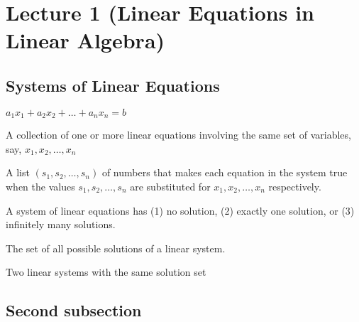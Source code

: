 
\section[Lecture 1 (16 August 2023) -- {\it Linear Equations in Linear Algebra}]{Lecture 1 (Linear Equations in Linear Algebra)}

\subsection{Systems of Linear Equations}

\begin{definition}
    $a_1 x_1 + a_2 x_2 + \ldots + a_n x_n = b$

\end{definition}

\begin{definition}
    A collection of one or more linear equations involving the same set of variables, say, $x_1, x_2, \ldots, x_n$
    
\end{definition}

\begin{definition}
    A list $\left( s_1, s_2, \ldots, s_n  \right)$ of numbers that makes each equation in the system true when the values $s_1, s_2, \ldots, s_n$ are substituted for $x_1, x_2, \ldots, x_n$ respectively.
\end{definition}

\begin{theorem}
    A system of linear equations has (1) no solution, (2) exactly one solution, or (3) infinitely many solutions.
\end{theorem}

\begin{definition}
    The set of all possible solutions of a linear system.
\end{definition}

\begin{definition}
    Two linear systems with the same solution set
\end{definition}

\subsection{Second subsection}

\lipsum[3]